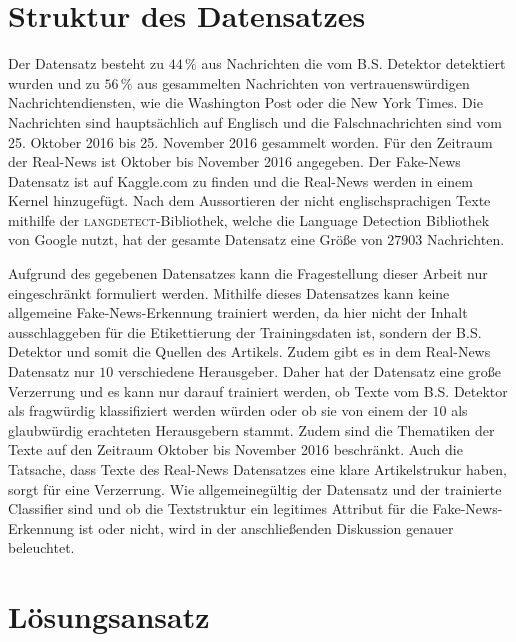 \chapter{Struktur des Datensatzes}
\label{sec:struct}

Der Datensatz besteht zu $44\,\%$ aus Nachrichten die vom B.S. Detektor detektiert wurden und zu $56\,\%$ aus gesammelten 
Nachrichten von vertrauenswürdigen Nachrichtendiensten, wie die Washington Post oder die New York Times. Die Nachrichten 
sind hauptsächlich auf Englisch und die Falschnachrichten sind vom 25. Oktober 2016 bis 25. November 2016 gesammelt worden. Für den Zeitraum 
der Real-News ist Oktober bis November 2016 angegeben. 
Der Fake-News Datensatz ist auf Kaggle.com zu finden\cite{fake_data} und die Real-News werden in einem Kernel hinzugefügt\cite{real_data}.
Nach dem Aussortieren der nicht englischsprachigen Texte mithilfe der \textsc{langdetect}-Bibliothek\cite{langdetect}, welche die
Language Detection Bibliothek von Google\cite{google_langdetect} nutzt, hat der gesamte Datensatz eine Größe von 
$\num{27903}$ Nachrichten.

Aufgrund des gegebenen Datensatzes kann die Fragestellung dieser Arbeit nur eingeschränkt formuliert werden.
Mithilfe dieses Datensatzes kann keine allgemeine Fake-News-Erkennung trainiert werden, da hier nicht der Inhalt 
ausschlaggeben für die Etikettierung der Trainingsdaten ist, sondern der B.S. Detektor und somit die Quellen des 
Artikels. 
Zudem gibt es in dem Real-News Datensatz nur $10$ verschiedene Herausgeber.
Daher hat der Datensatz eine große Verzerrung und es kann nur darauf trainiert werden, ob Texte vom B.S. Detektor 
als fragwürdig klassifiziert werden würden oder ob sie von einem der $10$ als glaubwürdig erachteten Herausgebern stammt.
Zudem sind die Thematiken der Texte auf den Zeitraum Oktober bis November 2016 beschränkt.
Auch die Tatsache, dass Texte des Real-News Datensatzes eine klare Artikelstrukur haben, sorgt für eine Verzerrung.
Wie allgemeinegültig der Datensatz und der trainierte Classifier sind und ob die Textstruktur ein legitimes Attribut für 
die Fake-News-Erkennung ist oder nicht, wird in der anschließenden Diskussion genauer beleuchtet.


\chapter{Lösungsansatz}
\label{sec:ansatz}

